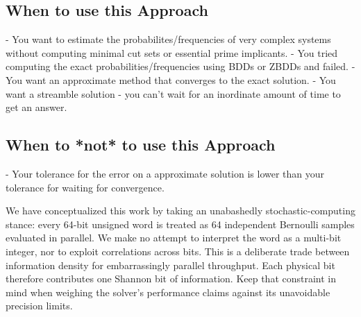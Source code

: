 \subsection*{When to use this Approach}
- You want to estimate the probabilites/frequencies of very complex systems without computing minimal cut sets or essential prime implicants.
- You tried computing the exact probabilities/frequencies using BDDs or ZBDDs and failed.
- You want an approximate method that converges to the exact solution.
- You want a streamble solution - you can't wait for an inordinate amount of time to get an answer.

\subsection*{When to *not* to use this Approach}
- Your tolerance for the error on a approximate solution is lower than your tolerance for waiting for convergence.

We have conceptualized this work by taking an unabashedly stochastic-computing stance: every 64-bit unsigned word is treated as 64 independent Bernoulli samples evaluated in parallel. We make no attempt to interpret the word as a multi-bit integer, nor to exploit correlations across bits. This is a deliberate trade between information density for embarrassingly parallel throughput. Each physical bit therefore contributes one Shannon bit of information. Keep that constraint in mind when weighing the solver’s performance claims against its unavoidable precision limits.


 

